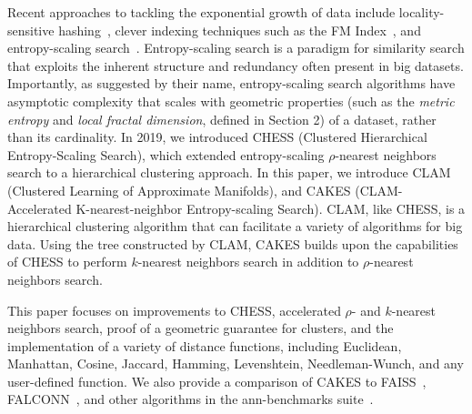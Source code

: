 Recent approaches to tackling the exponential growth of data include locality-sensitive hashing~\cite{bingham2001random}, 
clever indexing techniques such as the FM Index~\cite{ferragina2005indexing}, and entropy-scaling search~\cite{yu2015entropy, ishaq2019clustered}. 
Entropy-scaling search is a paradigm for similarity search that exploits the inherent structure and redundancy often present in big datasets.
Importantly, as suggested by their name, entropy-scaling search algorithms have asymptotic complexity that scales with geometric properties (such as the 
\emph{metric entropy} and \emph{local fractal dimension}, defined in Section 2) of a dataset,
rather than its cardinality. In 2019, we introduced CHESS (Clustered Hierarchical Entropy-Scaling Search), which extended entropy-scaling $\rho$-nearest 
neighbors search to a hierarchical clustering approach. In this paper, we introduce CLAM (Clustered Learning of Approximate Manifolds), and CAKES (CLAM-Accelerated K-nearest-neighbor 
Entropy-scaling Search). CLAM, like CHESS, is a hierarchical clustering algorithm 
that can facilitate a variety of algorithms for big data. Using the tree constructed by CLAM, CAKES builds upon the capabilities of CHESS to perform 
$k$-nearest neighbors search in addition to $\rho$-nearest neighbors search.


This paper focuses on improvements to CHESS, accelerated $\rho$- and $k$-nearest neighbors search, proof of a geometric guarantee for clusters, 
and the implementation of a variety of distance functions, including Euclidean, Manhattan, Cosine, Jaccard, Hamming, Levenshtein, Needleman-Wunch, 
and any user-defined function. We also provide a comparison of CAKES to FAISS~\cite{johnson2019billion}, FALCONN~\cite{andoni2015practical}, and
other algorithms in the ann-benchmarks suite~\cite{wang2017ann}.
